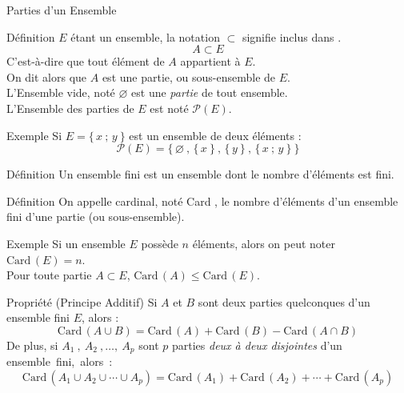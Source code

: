 \documentclass{coursbook}
\begin{document}
    \begin{Gpartie}{Parties d'un Ensemble}
        \begin{Spartie}{Définition}
            $E$ étant un ensemble, la notation $\subset$ signifie \og inclus dans \fg{}.
            \[A\subset E\]
            C'est-à-dire que tout élément de $A$ appartient à $E$. \\
            On dit alors que $A$ est une partie, ou sous-ensemble de $E$. \\
            L'Ensemble vide, noté $\varnothing$ est une \emph{partie} de tout ensemble. \\
            L'Ensemble des parties de $E$ est noté $\mathcal{P}(E)$.
            \begin{SSpartie}{Exemple}
                Si $E=\big\{\,x~;\,y~\big\}$ est un ensemble de deux éléments :
                \[\mathcal{P}(E)=\Big\{\,\varnothing~,\,\big\{\,x~\big\}~,\,\big\{\,y~\big\}~,\,\big\{\,x~;\,y~\big\}~\Big\}\]
            \end{SSpartie}
        \end{Spartie}
        \begin{Spartie}{Définition}
            Un ensemble fini est un ensemble dont le nombre d'éléments est fini.
        \end{Spartie}
        \begin{Spartie}{Définition}
            On appelle cardinal, noté \og Card \fg{}, le nombre d'éléments d'un ensemble fini d'une partie (ou sous-ensemble).
            \begin{SSpartie}{Exemple}
                Si un ensemble $E$ possède $n$ éléments, alors on peut noter $\mathrm{Card}\,(E)=n$. \\
                Pour toute partie $A\subset E$, $\mathrm{Card}\,(A)\leq\mathrm{Card}\,(E)$.
            \end{SSpartie}
        \end{Spartie}
        \begin{Spartie}{Propriété (Principe Additif)}
            Si $A$ et $B$ sont deux parties quelconques d'un ensemble fini $E$, alors :
            \[\mathrm{Card}\,(A\cup B)=\mathrm{Card}\,(A)+\mathrm{Card}\,(B)-\mathrm{Card}\,(A\cap B)\]
            De plus, si $A_1~,~A_2~,\dotsc,~A_p$ sont $p$ parties \emph{deux à deux disjointes} d'un ensemble~fini,~alors~:
            \[\mathrm{Card}\,\left(A_1\cup A_2\cup\dotsb\cup A_p\right)=\mathrm{Card}\,(A_1)+\mathrm{Card}\,(A_2)+\dotsb+\mathrm{Card}\,\left(A_p\right)\]
        \end{Spartie}

\end{Gpartie}
\end{document}
